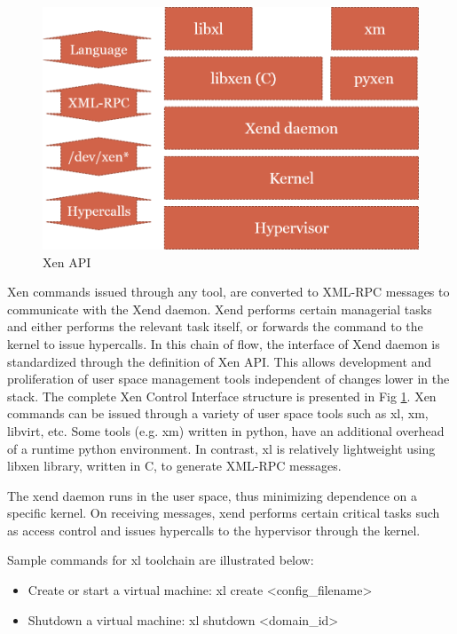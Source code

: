 \begin{figure}[H]
\centering
\includegraphics[scale=0.7]{figures/XEN_API.png}
\caption[Xen API]{Xen API \cite{chisnall_book}}
\label{fig:xen_api}
\end{figure}
Xen commands issued through any tool, are converted to XML-RPC messages to communicate with the Xend daemon. Xend performs certain managerial tasks and either performs the relevant task itself, or forwards the command to the kernel to issue hypercalls. In this chain of flow, the interface of Xend daemon is standardized through the definition of Xen API. This allows development and proliferation of user space management tools independent of changes lower in the stack. The complete Xen Control Interface structure is presented in Fig \ref{fig:xen_api}. Xen commands can be issued through a variety of user space tools such as xl, xm, libvirt, etc. Some tools (e.g. xm) written in python, have an additional overhead of a runtime python environment. In contrast, xl is relatively lightweight using libxen library, written in C, to generate XML-RPC messages.

The xend daemon runs in the user space, thus minimizing dependence on a specific kernel. On receiving messages, xend performs certain critical tasks such as access control and issues hypercalls to the hypervisor through the kernel.

Sample commands for xl toolchain are illustrated below:

\begin{itemize}
\item Create or start a virtual machine: xl create \textless config\_filename\textgreater

\item Shutdown a virtual machine: xl shutdown \textless domain\_id\textgreater
\end{itemize}


